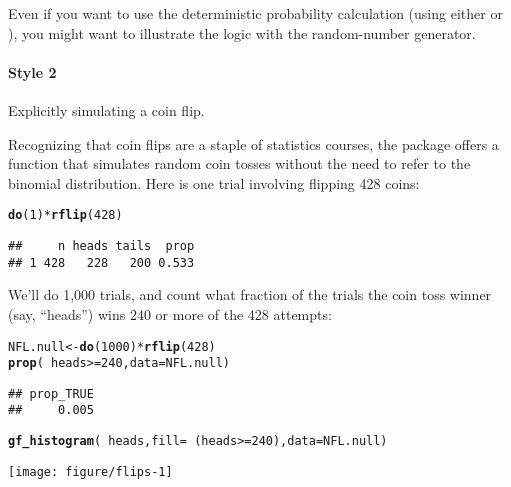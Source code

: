 \documentclass[11pt]{article}\usepackage[]{graphicx}\usepackage[]{color}
\makeatletter
\def\maxwidth{ %
  \ifdim\Gin@nat@width>\linewidth
    \linewidth
  \else
    \Gin@nat@width
  \fi
}
\newcommand{\hlnum}[1]{\textcolor[rgb]{0.686,0.059,0.569}{#1}}%
\newcommand{\hlopt}[1]{\textcolor[rgb]{0,0,0}{#1}}%
\newcommand{\hlstd}[1]{\textcolor[rgb]{0.345,0.345,0.345}{#1}}%
\newcommand{\hlkwb}[1]{\textcolor[rgb]{0.69,0.353,0.396}{#1}}%
\newcommand{\hlkwc}[1]{\textcolor[rgb]{0.333,0.667,0.333}{#1}}%
\newcommand{\hlkwd}[1]{\textcolor[rgb]{0.737,0.353,0.396}{\textbf{#1}}}%
\newenvironment{kframe}{%
 \def\at@end@of@kframe{}%
 \ifinner\ifhmode%
  \def\at@end@of@kframe{\end{minipage}}%
  \begin{minipage}{\columnwidth}%
 \fi\fi%
 \def\FrameCommand##1{\hskip\@totalleftmargin \hskip-\fboxsep
 \colorbox{shadecolor}{##1}\hskip-\fboxsep
     \hskip-\linewidth \hskip-\@totalleftmargin \hskip\columnwidth}%
 \MakeFramed {\advance\hsize-\width
   \@totalleftmargin\z@ \linewidth\hsize
   \@setminipage}}%
 {\par\unskip\endMakeFramed%
 \at@end@of@kframe}
\newenvironment{knitrout}{}{} %
\makeatother
\begin{document}
Even if you want to use the deterministic probability calculation (using either
 or ), you might want to illustrate the logic with the random-number generator.

\paragraph{Style 2} Explicitly simulating a coin flip.

Recognizing that coin flips are a staple of statistics courses, the
 package offers a function that simulates random coin tosses
without the need to refer to the binomial distribution.
Here is one trial involving flipping 428 coins:
\begin{knitrout}
\color{fgcolor}\begin{kframe}
\begin{alltt}
\hlkwd{do}\hlstd{(}\hlnum{1}\hlstd{)} \hlopt{*} \hlkwd{rflip}\hlstd{(}\hlnum{428}\hlstd{)}
\end{alltt}
\begin{verbatim}
##     n heads tails  prop
## 1 428   228   200 0.533
\end{verbatim}
\end{kframe}
\end{knitrout}

We'll do 1,000 trials, and count what fraction of the trials the
coin toss winner (say, ``heads'') wins 240 or more of the 428 attempts:
\begin{knitrout}
\color{fgcolor}\begin{kframe}
\begin{alltt}
\hlstd{NFL.null} \hlkwb{<-} \hlkwd{do}\hlstd{(}\hlnum{1000}\hlstd{)} \hlopt{*} \hlkwd{rflip}\hlstd{(}\hlnum{428}\hlstd{)}
\hlkwd{prop}\hlstd{(}\hlopt{~} \hlstd{heads} \hlopt{>=} \hlnum{240}\hlstd{,} \hlkwc{data} \hlstd{= NFL.null)}
\end{alltt}
\begin{verbatim}
## prop_TRUE 
##     0.005
\end{verbatim}
\end{kframe}
\end{knitrout}
\begin{knitrout}
\color{fgcolor}\begin{kframe}
\begin{alltt}
\hlkwd{gf_histogram}\hlstd{(}\hlopt{~} \hlstd{heads,} \hlkwc{fill} \hlstd{=} \hlopt{~} \hlstd{(heads} \hlopt{>=} \hlnum{240}\hlstd{),} \hlkwc{data} \hlstd{= NFL.null)}
\end{alltt}
\end{kframe}

{\centering \texttt{[image: figure/flips-1]} 

}



\end{knitrout}
\end{document}
